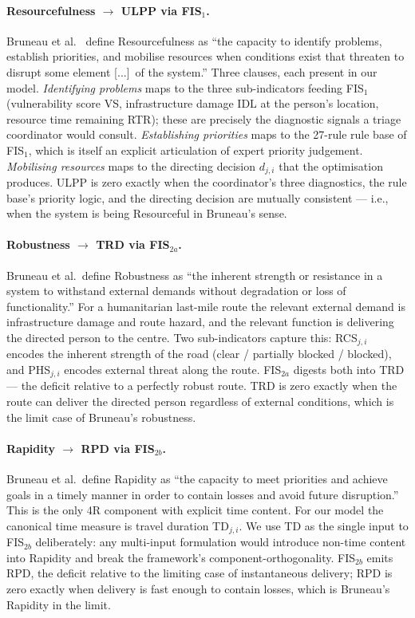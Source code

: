\documentclass[applsci,article,submit,moreauthors,pdftex]{Definitions/mdpi}
\begin{document}
\paragraph{Resourcefulness $\to$ ULPP via FIS$_1$.} Bruneau et al.\
\cite{bruneau2003} define Resourcefulness as ``the capacity to identify
problems, establish priorities, and mobilise resources when conditions
exist that threaten to disrupt some element [...]\ of the system.'' Three
clauses, each present in our model. \emph{Identifying problems} maps to
the three sub-indicators feeding FIS$_1$ (vulnerability score VS,
infrastructure damage IDL at the person's location, resource time
remaining RTR); these are precisely the diagnostic signals a triage
coordinator would consult. \emph{Establishing priorities} maps to the
27-rule rule base of FIS$_1$, which is itself an explicit articulation
of expert priority judgement. \emph{Mobilising resources} maps to the
directing decision $d_{j,i}$ that the optimisation produces. ULPP is
zero exactly when the coordinator's three diagnostics, the rule base's
priority logic, and the directing decision are mutually consistent ---
i.e., when the system is being Resourceful in Bruneau's sense.

\paragraph{Robustness $\to$ TRD via FIS$_{2a}$.} Bruneau et al.\ define
Robustness as ``the inherent strength or resistance in a system to
withstand external demands without degradation or loss of
functionality.'' For a humanitarian last-mile route the relevant
external demand is infrastructure damage and route hazard, and the
relevant function is delivering the directed person to the centre. Two
sub-indicators capture this: RCS$_{j,i}$ encodes the inherent strength
of the road (clear / partially blocked / blocked), and PHS$_{j,i}$
encodes external threat along the route. FIS$_{2a}$ digests both into
TRD --- the deficit relative to a perfectly robust route. TRD is zero
exactly when the route can deliver the directed person regardless of
external conditions, which is the limit case of Bruneau's robustness.

\paragraph{Rapidity $\to$ RPD via FIS$_{2b}$.} Bruneau et al.\ define
Rapidity as ``the capacity to meet priorities and achieve goals in a
timely manner in order to contain losses and avoid future
disruption.'' This is the only 4R component with explicit time content.
For our model the canonical time measure is travel duration TD$_{j,i}$.
We use TD as the single input to FIS$_{2b}$ deliberately: any
multi-input formulation would introduce non-time content into Rapidity
and break the framework's component-orthogonality. FIS$_{2b}$ emits
RPD, the deficit relative to the limiting case of instantaneous
delivery; RPD is zero exactly when delivery is fast enough to contain
losses, which is Bruneau's Rapidity in the limit.
\end{document}
